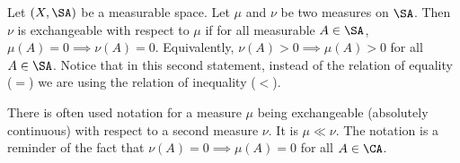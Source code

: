 Let $(X, \SA)$ be a measurable space.
Let $\mu$ and $\nu$ be two measures on $\SA$.
Then $\nu$ is exchangeable with respect to $\mu$ if for all measurable $A \in \SA$, $\mu(A) = 0 \implies \nu(A) = 0$.
Equivalently, $\nu(A) > 0 \implies \mu(A) > 0$ for all $A \in \SA$.
Notice that in this second statement, instead of the relation of equality ($=$) we are using the relation of inequality ($<$).

There is often used notation for a measure $\mu$ being exchangeable (absolutely continuous) with respect to a second measure $\nu$.
It is $\mu \ll \nu$.
The notation is a reminder of the fact that $\nu(A) = 0 \implies \mu(A) = 0$ for all $A \in \CA$.
